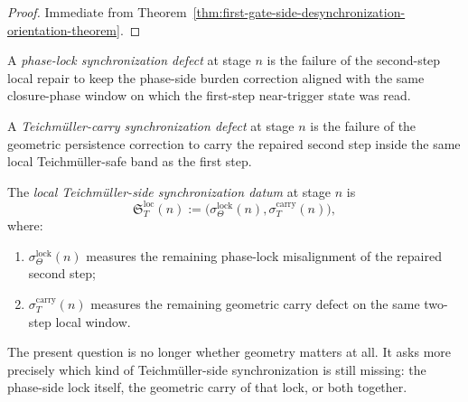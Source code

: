 \begin{proof}
Immediate from Theorem~\ref{thm:first-gate-side-desynchronization-orientation-theorem}.
\end{proof}




\begin{definition}
\label{def:phase-lock-synchronization-defect}
A \emph{phase-lock synchronization defect} at stage $n$ is the failure of the second-step local repair to keep the phase-side burden correction aligned with the same closure-phase window on which the first-step near-trigger state was read.
\end{definition}

\begin{definition}
\label{def:teichmueller-carry-synchronization-defect}
A \emph{Teichm\"uller-carry synchronization defect} at stage $n$ is the failure of the geometric persistence correction to carry the repaired second step inside the same local Teichm\"uller-safe band as the first step.
\end{definition}

\begin{definition}
\label{def:local-teichmueller-side-synchronization-datum}
The \emph{local Teichm\"uller-side synchronization datum} at stage $n$ is
\[
  \mathfrak S_T^{\mathrm{loc}}(n)
  :=
  \bigl(
    \sigma_{\Theta}^{\mathrm{lock}}(n),
    \sigma_{T}^{\mathrm{carry}}(n)
  \bigr),
\]
where:
\begin{enumerate}[leftmargin=2em,label=(\alph*)]
  \item $\sigma_{\Theta}^{\mathrm{lock}}(n)$ measures the remaining phase-lock misalignment of the repaired second step;
  \item $\sigma_T^{\mathrm{carry}}(n)$ measures the remaining geometric carry defect on the same two-step local window.
\end{enumerate}
\end{definition}

\begin{remark}
\label{rem:what-synchronization-means-locally}
The present question is no longer whether geometry matters at all. It asks more precisely which kind of Teichm\"uller-side synchronization is still missing: the phase-side lock itself, the geometric carry of that lock, or both together.
\end{remark}

